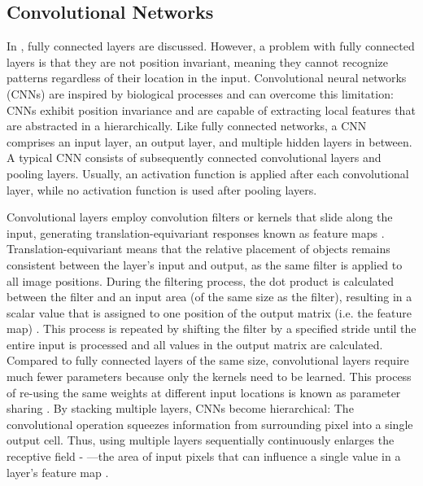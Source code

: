 \subsection{Convolutional Networks}
In , fully connected layers are discussed.
However, a problem with fully connected layers is that they are not position invariant, meaning they cannot recognize patterns regardless of their location in the input.
Convolutional neural networks (CNNs)  are inspired by biological processes  and can overcome this limitation: CNNs exhibit position invariance and are capable of extracting local features that are abstracted in a hierarchically.
Like fully connected networks, a CNN comprises an input layer, an output layer, and multiple hidden layers in between.
A typical CNN consists of subsequently connected convolutional layers and pooling layers.
Usually, an activation function is applied after each convolutional layer, while no activation function is used after pooling layers.

Convolutional layers employ convolution filters or kernels that slide along the input, generating translation-equivariant  responses known as feature maps .
Translation-equivariant means that the relative placement of objects remains consistent between the layer's input and output, as the same filter is applied to all image positions.
During the filtering process, the dot product is calculated between the filter and an input area (of the same size as the filter), resulting in a scalar value that is assigned to one position of the output matrix (i.e. the feature map) \cite{goodfellow_deep_2016}.
This process is repeated by shifting the filter by a specified stride until the entire input is processed and all values in the output matrix are calculated.
Compared to fully connected layers of the same size, convolutional layers require much fewer parameters because only the kernels need to be learned.
This process of re-using the same weights at different input locations is known as parameter sharing \cite{gerber_stride_2020}.
By stacking multiple layers, CNNs become hierarchical: The convolutional operation squeezes information from surrounding pixel into a single output cell. Thus, using multiple layers sequentially continuously enlarges the receptive field - —the area of input pixels that can influence a single value in a layer's feature map .

